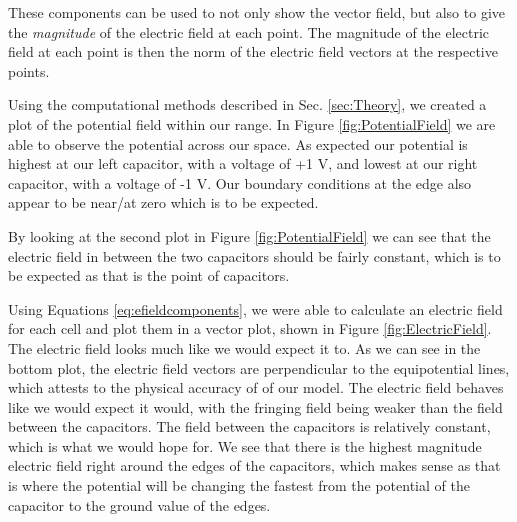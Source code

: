\documentclass{report}
\begin{document}
            These components can be used to not only show the vector field, but also to give the \emph{magnitude} of the electric field at each point.  The magnitude of the electric field at each point is then the norm of the electric field vectors at the respective points.

            Using the computational methods described in Sec. \ref{sec:Theory}, we created a plot of the potential field within our range. In Figure \ref{fig:PotentialField} we are able to observe the potential across our space. As expected our potential is highest at our left capacitor, with a voltage of +1 V, and lowest at our right capacitor, with a voltage of -1 V. Our boundary conditions at the edge also appear to be near/at zero which is to be expected. 
        
            By looking at the second plot in Figure \ref{fig:PotentialField} we can see that the electric field in between the two capacitors should be fairly constant, which is to be expected as that is the point of capacitors. 
            
            Using Equations \ref{eq:efieldcomponents}, we were able to calculate an electric field for each cell and plot them in a vector plot, shown in Figure \ref{fig:ElectricField}. The electric field looks much like we would expect it to. As we can see in the bottom plot, the electric field vectors are perpendicular to the equipotential lines, which attests to the physical accuracy of of our model. The electric field behaves like we would expect it would, with the fringing field being weaker than the field between the capacitors. The field between the capacitors is relatively constant, which is what we would hope for. We see that there is the highest magnitude electric field right around the edges of the capacitors, which makes sense as that is where the potential will be changing the fastest from the potential of the capacitor to the ground value of the edges.
            
\end{document}
